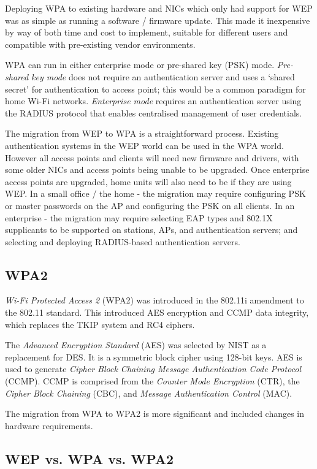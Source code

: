 Deploying WPA to existing hardware and NICs which only had support for WEP was as simple as running a software / firmware update. This made it inexpensive by way of both time and cost to implement, suitable for different users and compatible with pre-existing vendor environments.

WPA can run in either enterprise mode or pre-shared key (PSK) mode. \textit{Pre-shared key mode} does not require an authentication server and uses a `shared secret' for authentication to access point; this would be a common paradigm for home Wi-Fi networks. \textit{Enterprise mode} requires an authentication server using the RADIUS protocol that enables centralised management of user credentials. 

The migration from WEP to WPA is a straightforward process. Existing authentication systems in the WEP world can be used in the WPA world. However all access points and clients will need new firmware and drivers, with some older NICs and access points being unable to be upgraded. Once enterprise access points are upgraded, home units will also need to be if they are using WEP. In a small office / the home - the migration may require configuring PSK or master passwords on the AP and configuring the PSK on all clients. In an enterprise - the migration may require selecting EAP types and 802.1X supplicants to be supported on stations, APs, and authentication servers; and selecting and deploying RADIUS-based authentication servers.

\subsection{WPA2}
\textit{Wi-Fi Protected Access 2} (WPA2) was introduced in the 802.11i amendment to the 802.11 standard. This introduced AES encryption and CCMP data integrity, which replaces the TKIP system and RC4 ciphers. 

The \textit{Advanced Encryption Standard} (AES) was selected by NIST as a replacement for DES. It is a symmetric block cipher using 128-bit keys. AES is used to generate \textit{Cipher Block Chaining Message Authentication Code Protocol} (CCMP). CCMP is comprised from the \textit{Counter Mode Encryption} (CTR), the \textit{Cipher Block Chaining} (CBC), and \textit{Message Authentication Control} (MAC). 

The migration from WPA to WPA2 is more significant and included changes in hardware requirements.

\subsection{WEP vs. WPA vs. WPA2}

